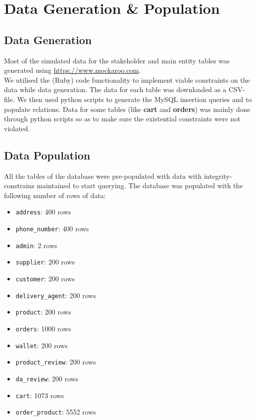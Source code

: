 \documentclass[12pt]{report}
\begin{document}
    \section*{\Huge Data Generation \& Population}
    \subsection*{Data Generation}
    Most of the simulated data for the stakeholder and main entity tables was generated using \href{https://www.mockaroo.com}{\color{blue}\underline{https://www.mockaroo.com}}. \\
    \newline
    We utilised the (Ruby) code functionality to implement viable constraints on the data while data generation.
    The data for each table was downloaded as a CSV-file.
    We then used python scripts to generate the MySQL insertion queries and to populate relations.
    Data for some tables (like \textbf{cart} and \textbf{orders}) was mainly done through python scripts so as to make sure the existential constraints were not violated.

    \subsection*{Data Population}
    All the tables of the database were pre-populated with data with integrity-constrains maintained to start querying.
    The database was populated with the following number of rows of data:
    \begin{multicols}{2}
        \begin{itemize}
            \item \texttt{address}: 400 rows
            \item \texttt{phone\_number}: 400 rows
            \item \texttt{admin}: 2 rows
            \item \texttt{supplier}: 200 rows
            \item \texttt{customer}: 200 rows
            \item \texttt{delivery\_agent}: 200 rows
            \item \texttt{product}: 200 rows
            \item \texttt{orders}: 1000 rows
            \item \texttt{wallet}: 200 rows
            \item \texttt{product\_review}: 200 rows
            \item \texttt{da\_review}: 200 rows
            \item \texttt{cart}: 1073 rows
            \item \texttt{order\_product}: 5552 rows
        \end{itemize}
    \end{multicols}
\end{document}
